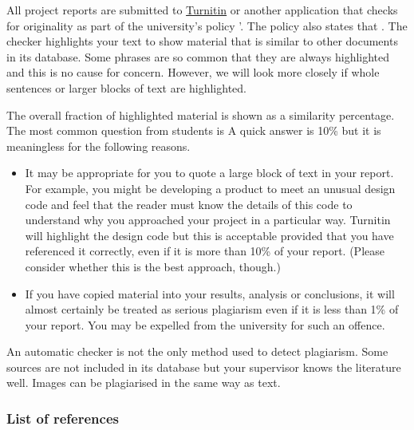 All project reports are submitted to \href{http://www.submit.ac.uk/}{Turnitin}
or another application that checks for originality as part of the university’s
policy '. The policy also states that
. The checker highlights your text to
show material that is similar to other documents in its database. Some phrases
are so common that they are always highlighted and this is no cause for concern.
However, we will look more closely if whole sentences or larger blocks of text
are highlighted.

The overall fraction of highlighted material is shown as a similarity
percentage. The most common question from students is  A quick answer is 10\% but it is meaningless for the
following reasons.

\begin{itemize}
    \item It may be appropriate for you to quote a large block of text in your
          report. For example, you might be developing a product to meet an
          unusual design code and feel that the reader must know the details of
          this code to understand why you approached your project in a
          particular way. Turnitin will highlight the design code but this is
          acceptable provided that you have referenced it correctly, even if it
          is more than 10\% of your report. (Please consider whether this is the
          best approach, though.)
    \item If you have copied material into your results, analysis or
          conclusions, it will almost certainly be treated as serious plagiarism
          even if it is less than 1\% of your report. You may be expelled from
          the university for such an offence.
\end{itemize}

An automatic checker is not the only method used to detect plagiarism. Some
sources are not included in its database but your supervisor knows the
literature well. Images can be plagiarised in the same way as text.

\subsubsection{List of references}


